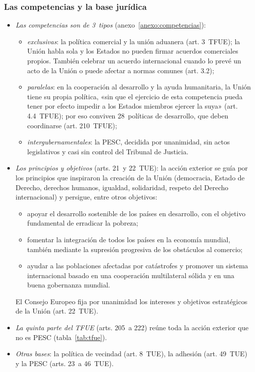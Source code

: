 \documentclass[11pt]{article}
\begin{document}
\subsubsection{Las competencias y la base jurídica}\label{sec:base}

\begin{itemize}
\item \emph{Las competencias son de 3~tipos} (anexo~\ref{anexo:competencias}):
  \begin{itemize}
  \item \emph{exclusivas}: la política comercial y la unión aduanera (art. 3~TFUE); la Unión habla sola y los Estados no pueden firmar acuerdos comerciales propios. También celebrar un acuerdo internacional cuando lo prevé un acto de la Unión o puede afectar a normas comunes (art. 3.2);
  \item \emph{paralelas}: en la cooperación al desarrollo y la ayuda humanitaria, la Unión tiene su propia política, «sin que el ejercicio de esta competencia pueda tener por efecto impedir a los Estados miembros ejercer la suya» (art. 4.4~TFUE); por eso conviven 28~políticas de desarrollo, que deben coordinarse (art. 210~TFUE);
  \item \emph{intergubernamentales}: la PESC, decidida por unanimidad, sin actos legislativos y casi sin control del Tribunal de Justicia.
  \end{itemize}
\item \emph{Los principios y objetivos} (arts. 21~y 22~TUE): la acción exterior se guía por los principios que inspiraron la creación de la Unión (democracia, Estado de Derecho, derechos humanos, igualdad, solidaridad, respeto del Derecho internacional) y persigue, entre otros objetivos\nocite{UE2016TUE}:
  \begin{itemize}
  \item apoyar el desarrollo sostenible de los países en desarrollo, con el objetivo fundamental de erradicar la pobreza;
  \item fomentar la integración de todos los países en la economía mundial, también mediante la supresión progresiva de los obstáculos al comercio;
  \item ayudar a las poblaciones afectadas por catástrofes y promover un sistema internacional basado en una cooperación multilateral sólida y en una buena gobernanza mundial.
  \end{itemize}
  El Consejo Europeo fija por unanimidad los intereses y objetivos estratégicos de la Unión (art. 22~TUE).
\item \emph{La quinta parte del TFUE} (arts. 205~a 222) reúne toda la acción exterior que no es PESC (tabla~\ref{tab:tfue})\nocite{UE2016TFUE}.
\item \emph{Otras bases}: la política de vecindad (art. 8~TUE), la adhesión (art. 49~TUE) y la PESC (arts. 23~a 46~TUE).
\end{itemize}
\end{document}
